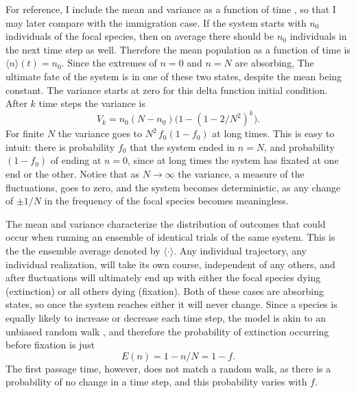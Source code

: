 For reference, I include the mean and variance as a function of time \cite{???, Moran1962}, so that I may later compare with the immigration case.
If the system starts with $n_0$ individuals of the focal species, then on average there should be $n_0$ individuals in the next time step as well.
Therefore the mean population as a function of time is $\langle n\rangle(t) = n_0$. 
Since the extremes of $n=0$ and $n=N$ are absorbing, The ultimate fate of the system is in one of these two states, despite the mean being constant. 
The variance starts at zero for this delta function initial condition. 
After $k$ time steps the variance is
\begin{equation*}
V_k = n_0(N-n_0) \big(1-(1-2/N^2)^k\big).
\end{equation*}
For finite $N$ the variance goes to $N^2 \, f_0(1-f_0)$ at long times. 
This is easy to intuit: there is probability $f_0$ that the system ended in $n=N$, and probability $(1-f_0)$ of ending at $n=0$, since at long times the system has fixated at one end or the other. 
Notice that as $N\rightarrow\infty$ the variance, a measure of the fluctuations, goes to zero, and the system becomes deterministic, as any change of $\pm 1/N$ in the frequency of the focal species becomes meaningless. 

The mean and variance characterize the distribution of outcomes that could occur when running an ensemble of identical trials of the same system. 
This is the the ensemble average denoted by $\langle \cdot \rangle$. 
Any individual trajectory, any individual realization, will take its own course, independent of any others, and after fluctuations will ultimately end up with either the focal species dying (extinction) or all others dying (fixation). 
Both of these cases are absorbing states, so once the system reaches either it will never change.
Since a species is equally likely to increase or decrease each time step, the model is akin to an unbiased random walk \cite{Gardiner2004}, and therefore the probability of extinction occurring before fixation is just
\begin{equation}
E(n) = 1-n/N = 1-f.
\end{equation}
The first passage time, however, does not match a random walk, as there is a probability of no change in a time step, and this probability varies with $f$.

